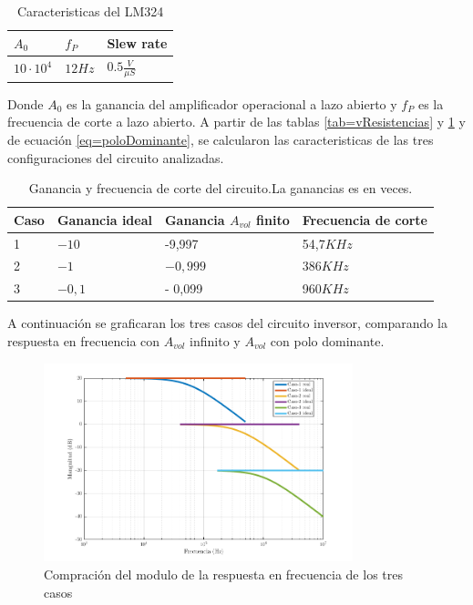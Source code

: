 \documentclass[../../main.tex]{subfiles}
\begin{document}
\begin{table}[h]
\begin{center}
\begin{tabular}{|l|l|l|}
\hline
$A_{0}$ & $f_{P}$ & Slew rate \\
\hline \hline
$10\cdot 10^{4}$& $ 12Hz $ & $0.5 \frac{V}{\mu S}$\\ \hline

\end{tabular}
\caption{Caracteristicas del LM324} 
\label{tab=lm324Carac}
\end{center}
\end{table}
Donde $A_{0}$ es la ganancia del amplificador operacional a lazo abierto y  $f_{P}$ es la frecuencia de corte a lazo abierto. A partir de las tablas \ref{tab=vResistencias} y \ref{tab=lm324Carac} y de ecuación  \ref{eq=poloDominante}, se calcularon las caracteristicas de las tres configuraciones del circuito analizadas.

\begin{table}[h]
\begin{center}
\begin{tabular}{|l|l|l|l|}
\hline
Caso &Ganancia ideal & Ganancia $A_{vol}$ finito & Frecuencia de corte\\
\hline \hline
1 & $-10$ & -9,997 & 54,7$KHz$ \\ \hline
2 & $-1$ &  $-0,999 $ &  386$KHz$  \\ \hline
3 & $-0,1$ &- 0,099 &960$KHz$\\ \hline
\end{tabular}
\caption{Ganancia y frecuencia de corte del circuito.La ganancias es en veces.} 
\label{tab=gananciayFrecCorte}
\end{center}
\end{table}

A continuación se graficaran los tres casos del circuito inversor, comparando la respuesta en frecuencia con $A_{vol}$ infinito y $A_{vol}$ con polo dominante.

\begin{figure}[H]
\centering
\includegraphics[width=0.8\textwidth]{real_ideal_mag_inv}
\caption{Compración del modulo de la respuesta en frecuencia de los tres casos}
\end{figure}
\end{document}
